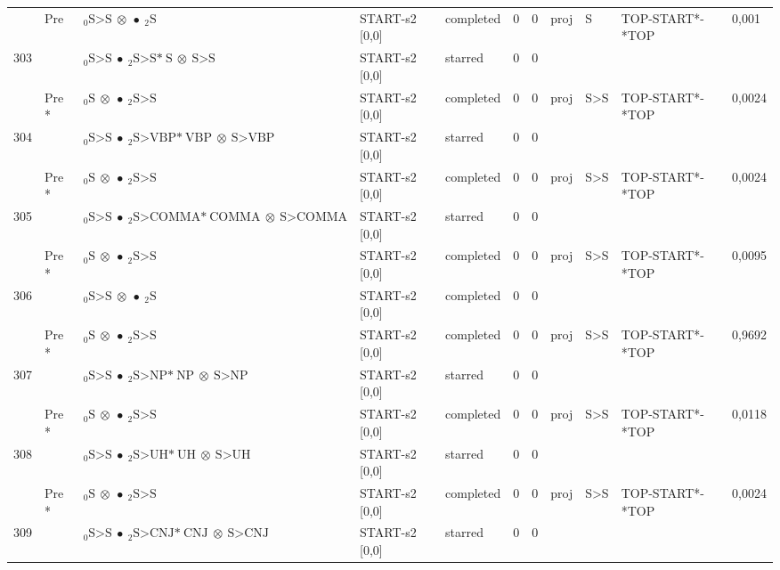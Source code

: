 \documentclass[10pt]{article}
\begin{document}
\begin{longtable}[htbp]{lllllllllll}
 & Pre & $ {}_0 \textrm{S>S} \  \otimes \  \bullet \ {}_{2} \textrm{S} $ & START-s2 [0,0] & completed & 0 & 0 & proj & S & TOP-START*-*TOP & 0,001 \\ 
303 & & $ {}_0 \textrm{S>S} \  \bullet \ {}_{2} \textrm{S>S*} \ \textrm{S} \  \otimes \ \textrm{S>S} $ & START-s2 [0,0] & starred & 0 & 0 & & & & \\ 
 & Pre *& $ {}_0 \textrm{S} \  \otimes \  \bullet \ {}_{2} \textrm{S>S} $ & START-s2 [0,0] & completed & 0 & 0 & proj & S>S & TOP-START*-*TOP & 0,0024 \\ 
304 & & $ {}_0 \textrm{S>S} \  \bullet \ {}_{2} \textrm{S>VBP*} \ \textrm{VBP} \  \otimes \ \textrm{S>VBP} $ & START-s2 [0,0] & starred & 0 & 0 & & & & \\ 
 & Pre *& $ {}_0 \textrm{S} \  \otimes \  \bullet \ {}_{2} \textrm{S>S} $ & START-s2 [0,0] & completed & 0 & 0 & proj & S>S & TOP-START*-*TOP & 0,0024 \\ 
305 & & $ {}_0 \textrm{S>S} \  \bullet \ {}_{2} \textrm{S>COMMA*} \ \textrm{COMMA} \  \otimes \ \textrm{S>COMMA} $ & START-s2 [0,0] & starred & 0 & 0 & & & & \\ 
 & Pre *& $ {}_0 \textrm{S} \  \otimes \  \bullet \ {}_{2} \textrm{S>S} $ & START-s2 [0,0] & completed & 0 & 0 & proj & S>S & TOP-START*-*TOP & 0,0095 \\ 
306 & & $ {}_0 \textrm{S>S} \  \otimes \  \bullet \ {}_{2} \textrm{S} $ & START-s2 [0,0] & completed & 0 & 0 & & & & \\ 
 & Pre *& $ {}_0 \textrm{S} \  \otimes \  \bullet \ {}_{2} \textrm{S>S} $ & START-s2 [0,0] & completed & 0 & 0 & proj & S>S & TOP-START*-*TOP & 0,9692 \\ 
307 & & $ {}_0 \textrm{S>S} \  \bullet \ {}_{2} \textrm{S>NP*} \ \textrm{NP} \  \otimes \ \textrm{S>NP} $ & START-s2 [0,0] & starred & 0 & 0 & & & & \\ 
 & Pre *& $ {}_0 \textrm{S} \  \otimes \  \bullet \ {}_{2} \textrm{S>S} $ & START-s2 [0,0] & completed & 0 & 0 & proj & S>S & TOP-START*-*TOP & 0,0118 \\ 
308 & & $ {}_0 \textrm{S>S} \  \bullet \ {}_{2} \textrm{S>UH*} \ \textrm{UH} \  \otimes \ \textrm{S>UH} $ & START-s2 [0,0] & starred & 0 & 0 & & & & \\ 
 & Pre *& $ {}_0 \textrm{S} \  \otimes \  \bullet \ {}_{2} \textrm{S>S} $ & START-s2 [0,0] & completed & 0 & 0 & proj & S>S & TOP-START*-*TOP & 0,0024 \\ 
309 & & $ {}_0 \textrm{S>S} \  \bullet \ {}_{2} \textrm{S>CNJ*} \ \textrm{CNJ} \  \otimes \ \textrm{S>CNJ} $ & START-s2 [0,0] & starred & 0 & 0 & & & & \\ 

\end{longtable}
\end{document}
